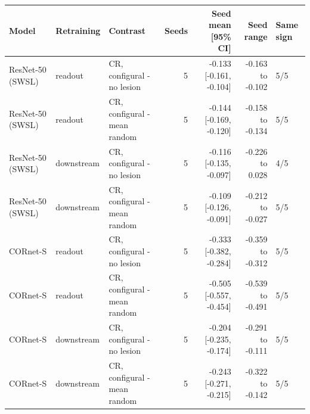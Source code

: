 \begin{tabular}{lllrrrl}
\hline
Model & Retraining & Contrast & Seeds & Seed mean [95\% CI] & Seed range & Same sign \\
\hline
ResNet-50 (SWSL) & readout & CR, configural - no lesion & 5 & -0.133 [-0.161, -0.104] & -0.163 to -0.102 & 5/5 \\
ResNet-50 (SWSL) & readout & CR, configural - mean random & 5 & -0.144 [-0.169, -0.120] & -0.158 to -0.134 & 5/5 \\
ResNet-50 (SWSL) & downstream & CR, configural - no lesion & 5 & -0.116 [-0.135, -0.097] & -0.226 to 0.028 & 4/5 \\
ResNet-50 (SWSL) & downstream & CR, configural - mean random & 5 & -0.109 [-0.126, -0.091] & -0.212 to -0.027 & 5/5 \\
CORnet-S & readout & CR, configural - no lesion & 5 & -0.333 [-0.382, -0.284] & -0.359 to -0.312 & 5/5 \\
CORnet-S & readout & CR, configural - mean random & 5 & -0.505 [-0.557, -0.454] & -0.539 to -0.491 & 5/5 \\
CORnet-S & downstream & CR, configural - no lesion & 5 & -0.204 [-0.235, -0.174] & -0.291 to -0.111 & 5/5 \\
CORnet-S & downstream & CR, configural - mean random & 5 & -0.243 [-0.271, -0.215] & -0.322 to -0.142 & 5/5 \\
\hline
\end{tabular}